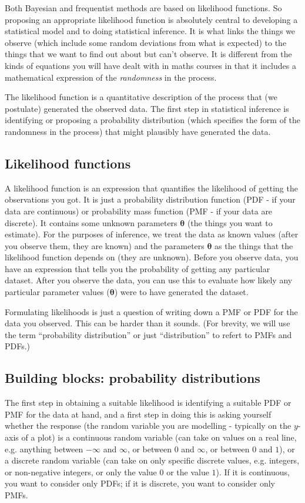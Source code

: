 Both Bayesian and frequentist methods are based on likelihood functions. So proposing an appropriate likelihood function is absolutely central to developing a statistical model and to doing statistical inference. It is what links the things we observe (which include some random deviations from what is expected) to the things that we want to find out about but can't observe. It is different from the kinds of equations you will have dealt with in maths courses in that it includes a mathematical expression of the \textit{randomness} in the process.

The likelihood function is a quantitative description of the process that (we postulate) generated the observed data. The first step in statistical inference is identifying or proposing a probability distribution (which specifies the form of the randomness in the process) that might plausibly have generated the data.


\subsection{Likelihood functions}

A likelihood function is an expression that quantifies the likelihood of getting the observations you got. It is just a probability distribution function (PDF - if your data are continuous) or probability mass function (PMF - if your data are discrete). It contains some unknown parameters $\bm{\theta}$ (the things you want to estimate). For the purposes of inference, we treat the data as known values (after you observe them, they are known) and the parameters $\bm{\theta}$ as the things that the likelihood function depends on (they are unknown). Before you observe data, you have an expression that tells you the probability of getting any particular dataset. After you observe the data, you can use this to evaluate how likely any particular parameter values ($\bm{\theta}$) were to have generated the dataset.

Formulating likelihoods is just a question of writing down a PMF or PDF for the data you observed. This can be harder than it sounds. (For brevity, we will use the term ``probability distribution'' or just ``distribution'' to refert to PMFs and PDFs.)

\subsection{Building blocks: probability distributions}

The first step in obtaining a suitable likelihood is identifying a suitable PDF or PMF for the data at hand, and a first step in doing this is asking yourself whether the response (the random variable you are modelling - typically on the $y$-axis of a plot) is a continuous random variable (can take on values on a real line, e.g. anything between $-\infty$ and $\infty$, or between $0$ and $\infty$, or between $0$ and $1$), or a discrete random variable (can take on only specific discrete values, e.g. integers, or non-negative integers, or only the value $0$ or the value $1$). If it is continuous, you want to consider only PDFs; if it is discrete, you want to consider only PMFs.

